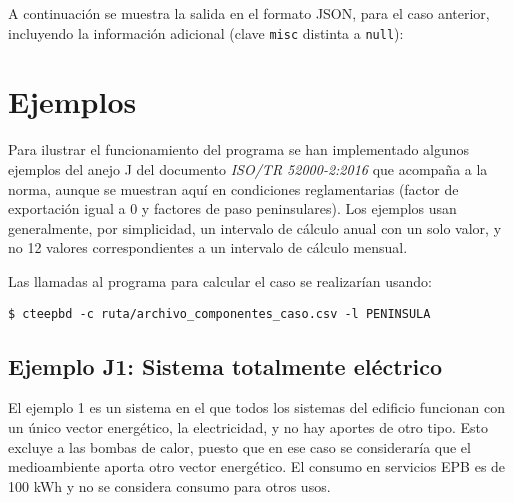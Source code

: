 \documentclass[10pt,notitlepage,oneside,a4paper]{article}
\begin{document}
A continuación se muestra la salida en el formato JSON, para el caso anterior, incluyendo la información adicional (clave \texttt{misc} distinta a \texttt{null}):



\clearpage
\newpage


\setcounter{section}{0} %
\renewcommand\thesection{Anexo~\Roman{section}}
\renewcommand\theHsection{Anexo~\Roman{section}}
\renewcommand\thesubsection{\Roman{section}.\arabic{subsection}}
\renewcommand\theHsubsection{\Roman{section}.\arabic{subsection}}
\renewcommand{\thefigure}{\Roman{section}.\arabic{figure}}
\renewcommand{\theHfigure}{\Roman{section}.\arabic{figure}}
\renewcommand{\thetable}{\Roman{section}.\arabic{table}}
\renewcommand{\theHtable}{\Roman{section}.\arabic{table}}

\section{Ejemplos}
\label{sec:anexoejemplos}
\setcounter{figure}{0} %
\setcounter{table}{0} %

Para ilustrar el funcionamiento del programa se han implementado algunos ejemplos del anejo J del documento \textit{ISO/TR 52000-2:2016} que acompaña a la norma, aunque se muestran aquí en condiciones reglamentarias (factor de exportación igual a 0 y factores de paso peninsulares). Los ejemplos usan generalmente, por simplicidad, un intervalo de cálculo anual con un solo valor, y no 12 valores correspondientes a un intervalo de cálculo mensual.

Las llamadas al programa para calcular el caso se realizarían usando:

\begin{Verbatim}[fontsize=\small]
    $ cteepbd -c ruta/archivo_componentes_caso.csv -l PENINSULA
\end{Verbatim}

\subsection{Ejemplo J1: Sistema totalmente eléctrico}
El ejemplo 1 es un sistema en el que todos los sistemas del edificio funcionan con un único vector energético, la electricidad, y no hay aportes de otro tipo. Esto excluye a las bombas de calor, puesto que en ese caso se consideraría que el medioambiente aporta otro vector energético. El consumo en servicios EPB es de 100 kWh y no se considera consumo para otros usos.
\end{document}
